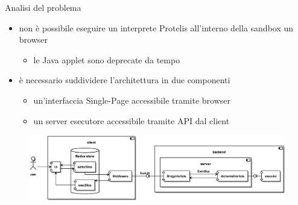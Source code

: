     \begin{frame}{\insertsectionhead}{\insertsubsectionhead}

      \begin{block}{Analisi del problema}
        \begin{itemize}
          \item
            non è possibile eseguire un interprete Protelis all'interno della sandbox un browser
            \begin{itemize}
              \item le Java applet sono deprecate da tempo
            \end{itemize}
          \item
            è necessario suddividere l'architettura in due componenti
            \begin{itemize}
              \item un'interfaccia Single-Page accessibile tramite browser
              \item un server esecutore accessibile tramite API dal client
            \end{itemize}
        \end{itemize}
      \end{block}

      \begin{figure}
        \includegraphics[width=.71\textwidth]{../res/uml/architecture-design.eps}
      \end{figure}

    \end{frame}
